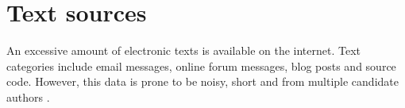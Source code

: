 \section{Text sources}
\label{sec:text_sources}

An excessive amount of electronic texts is available on the internet.
Text categories include email messages, online forum messages, blog posts and source code.
However, this data is prone to be noisy, short and from multiple candidate authors \citep{stamatatos_survey_2009}.
